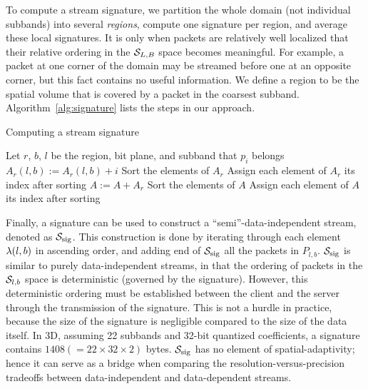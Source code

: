 To compute a stream signature, we partition the whole domain (not individual
subbands) into several \emph{regions}, compute one signature per region, and
average these local signatures. It is only when packets are relatively well
localized that their relative ordering in the $\strm_{L,B}$ space becomes
meaningful. For example, a packet at one corner of the domain may be streamed
before one at an opposite corner, but this fact contains no useful information.
We define a region to be the spatial volume that is covered by a packet in the
coarsest subband. Algorithm~\ref{alg:signature} lists the steps in our
approach.

\begin{algorithm}[h]
  \small
  \caption{Computing a stream signature}
  \begin{algorithmic}[1]
			\State Let $r$, $b$, $l$ be the region, bit plane, and subband that $p_i$ belongs
			\State $A_r(l,b) := A_r(l,b)+i$
		\EndFor
			\State Sort the elements of $A_r$
			\State Assign each element of $A_r$ its index after sorting
			\State $A := A+A_r$
		\EndFor
		\State Sort the elements of $A$
		\State Assign each element of $A$ its index after sorting
	\end{algorithmic}
	\label{alg:signature}
\end{algorithm}

Finally, a signature can be used to construct a ``semi''-data-independent
stream, denoted as $\ssig$. This construction is done by iterating through
each element $\sgn(l,b)$ in ascending order, and adding end of $\ssig$ all the
packets in $P_{l,b}$. $\ssig$ is similar to purely data-independent streams,
in that the ordering of packets in the $\strm_{l,b}$ space is deterministic
(governed by the signature). However, this deterministic ordering must be
established between the client and the server through the transmission of the
signature. This is not a hurdle in practice, because the size of the signature
is negligible compared to the size of the data itself. In 3D, assuming
22 subbands and 32-bit quantized coefficients, a signature contains $1408
(=22\times 32\times 2)$ bytes. $\ssig$ has no element of spatial-adaptivity;
hence it can serve as a bridge when comparing the resolution-versus-precision
tradeoffs between data-independent and data-dependent streams.